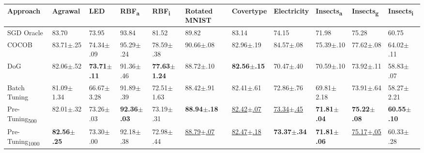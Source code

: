 \begin{tabular}{lllllllllll}
    \toprule
    Approach                       & Agrawal                 & LED                     & RBF\textsubscript{a}    & RBF\textsubscript{i}     & Rotated MNIST             & Covertype                 & Electricity               & Insects\textsubscript{a} & Insects\textsubscript{g}  & Insects\textsubscript{i} \\
    \midrule
    SGD Oracle                     & 83.70                   & 73.95                   & 93.84                   & 81.52                    & 89.82                     & 83.14                     & 74.15                     & 71.98                    & 75.28                     & 60.75                    \\
    COCOB                          & 83.71$\pm$.25           & 74.34$\pm$.09           & 95.29$\pm$.24           & 78.59$\pm$.38            & 90.66$\pm$.08             & 82.96$\pm$.19             & 84.57$\pm$.08             & 75.39$\pm$.10            & 77.62$\pm$.08             & 64.02$\pm$.11            \\ \midrule
    DoG                            & 82.06$\pm$.52           & \bfseries 73.71$\pm$.11 & 91.36$\pm$.46           & \bfseries 77.63$\pm$1.24 & 88.72$\pm$.10             & \bfseries 82.56$\pm$.15   & 70.47$\pm$.40             & 70.59$\pm$.10            & 73.92$\pm$.11             & 58.83$\pm$.07            \\
    Batch Tuning                   & 81.09$\pm$1.34          & 66.67$\pm$3.28          & 91.89$\pm$.39           & 72.51$\pm$1.63           & 88.42$\pm$.91             & 82.41$\pm$.61             & 72.86$\pm$.76             & 69.81$\pm$2.18           & 73.91$\pm$.64             & 58.27$\pm$2.21           \\
    Pre-Tuning\textsubscript{500}  & 82.01$\pm$.32           & 73.26$\pm$.03           & \bfseries 92.36$\pm$.03 & 73.19$\pm$.31            & \bfseries 88.94$\pm$.18   & \underline{82.42$\pm$.07} & \underline{73.34$\pm$.45} & \bfseries 71.81$\pm$.04  & \bfseries 75.22$\pm$.08   & \bfseries 60.55$\pm$.10  \\
    Pre-Tuning\textsubscript{1000} & \bfseries 82.56$\pm$.25 & 73.30$\pm$.00           & 92.18$\pm$.38           & 72.98$\pm$.44            & \underline{88.79$\pm$.07} & \underline{82.47$\pm$.18} & \bfseries 73.37$\pm$.34   & \bfseries 71.81$\pm$.06  & \underline{75.17$\pm$.05} & 60.33$\pm$.28            \\
    \bottomrule
\end{tabular}
